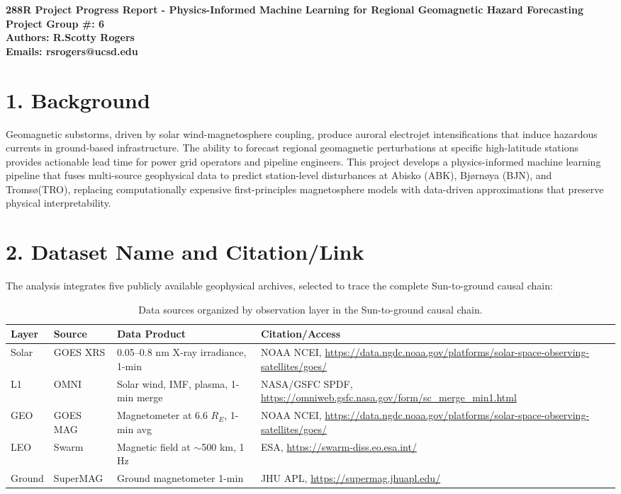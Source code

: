 \documentclass{article}
\begin{document}
\begin{center}
\Large\textbf{288R Project Progress Report - Physics-Informed Machine Learning for Regional Geomagnetic Hazard Forecasting}\\
\Large\textbf{Project Group \#: 6}\\
\Large\textbf{Authors: R.Scotty Rogers}\\
\Large\textbf{Emails: rsrogers@ucsd.edu}\\
\end{center}

\section*{1. Background}

Geomagnetic substorms, driven by solar wind-magnetosphere coupling, produce auroral electrojet intensifications that induce hazardous currents in ground-based infrastructure. The ability to forecast regional geomagnetic perturbations at specific high-latitude stations provides actionable lead time for power grid operators and pipeline engineers. This project develops a physics-informed machine learning pipeline that fuses multi-source geophysical data to predict station-level disturbances at Abisko (ABK), Bj\o rn\o ya (BJN), and Troms\o (TRO), replacing computationally expensive first-principles magnetosphere models with data-driven approximations that preserve physical interpretability.

\section*{2. Dataset Name and Citation/Link}

The analysis integrates five publicly available geophysical archives, selected to trace the complete Sun-to-ground causal chain:

\begin{table}[H]
\centering
\begin{tabular}{lllp{5cm}}
\toprule
\textbf{Layer} & \textbf{Source} & \textbf{Data Product} & \textbf{Citation/Access} \\
\midrule
Solar & GOES XRS & 0.05--0.8 nm X-ray irradiance, 1-min & NOAA NCEI, \url{https://data.ngdc.noaa.gov/platforms/solar-space-observing-satellites/goes/} \\
L1 & OMNI & Solar wind, IMF, plasma, 1-min merge & NASA/GSFC SPDF, \url{https://omniweb.gsfc.nasa.gov/form/sc_merge_min1.html} \\
GEO & GOES MAG & Magnetometer at 6.6 $R_E$, 1-min avg & NOAA NCEI, \url{https://data.ngdc.noaa.gov/platforms/solar-space-observing-satellites/goes/} \\
LEO & Swarm & Magnetic field at $\sim$500 km, 1 Hz & ESA, \url{https://swarm-diss.eo.esa.int/} \\
Ground & SuperMAG & Ground magnetometer 1-min & JHU APL, \url{https://supermag.jhuapl.edu/} \\
\bottomrule
\end{tabular}
\caption{Data sources organized by observation layer in the Sun-to-ground causal chain.}
\end{table}
\end{document}
